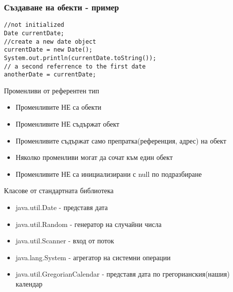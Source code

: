 \documentclass{beamer}
\begin{document}
\begin{frame}[fragile]
  \frametitle{Създаване на обекти - пример}
  \transdissolve
\begin{lstlisting}
//not initialized
Date currentDate;
//create a new date object
currentDate = new Date();
System.out.println(currentDate.toString());
// a second referrence to the first date
anotherDate = currentDate;
\end{lstlisting}
\end{frame}

\begin{frame}{Променливи от референтен тип}
  \transdissolve
  \begin{itemize}
  \item Променливите \alert{НЕ} са обекти \pause
  \item Променливите \alert{НЕ} съдържат обект \pause
  \item Променливите \alert{съдържат само препратка(референция,
      адрес)} на обект \pause
  \item Няколко променливи могат да сочат към
    един обект \pause
  \item Променливите \alert{НЕ} са инициализирани с
    null по подразбиране
  \end{itemize}
\end{frame}

\begin{frame}{Класове от стандартната библиотека}
  \transdissolve
  \begin{itemize}
  \item java.util.Date -  представя дата
  \item java.util.Random - генератор на случайни числа
  \item java.util.Scanner - вход от поток
  \item java.lang.System - агрегатор на системни
    операции
  \item java.util.GregorianCalendar - представя дата по
    грегорианския(нашия) календар
  \end{itemize}
\end{frame}
\end{document}
